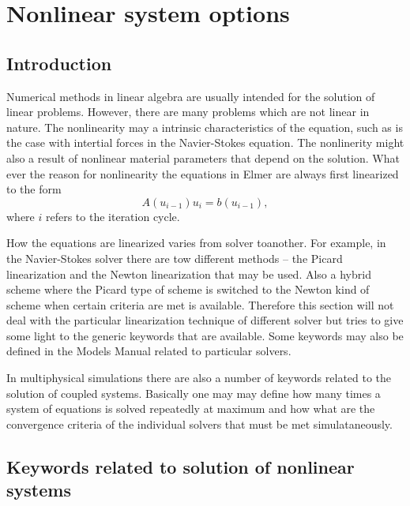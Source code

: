 \chapter{Nonlinear system options}
\noindent

\section{Introduction}

Numerical methods in linear algebra are usually intended for the solution of linear
problems. However, there are many problems which are not linear in nature. The nonlinearity 
may a intrinsic characteristics of the equation, such as is the case with intertial forces
in the Navier-Stokes equation. The nonlinerity might also a result of nonlinear material parameters
that depend on the solution. What ever the reason for nonlinearity the equations in Elmer are 
always first linearized to the form
\begin{equation}\label{ModelLinearSystem}
A(u_{i-1})u_i = b(u_{i-1}),
\end{equation}
where $i$ refers to the iteration cycle. 

How the equations are linearized varies from solver toanother. For example, in the Navier-Stokes 
solver there are tow different methods -- the Picard linearization and the Newton linearization that 
may be used. Also a hybrid scheme where the Picard type of scheme is switched to the 
Newton kind of scheme when certain criteria are met is available. Therefore this section will
not deal with the particular linearization technique of different solver but tries to 
give some light to the generic keywords that are available. Some keywords may also be defined
in the Models Manual related to particular solvers. 

In multiphysical simulations there are also a number of keywords related to 
the solution of coupled systems. Basically one may may define how many times a 
system of equations is solved repeatedly at maximum and how what are the convergence
criteria of the individual solvers that must be met simulataneously.


\section{Keywords related to solution of nonlinear systems}

